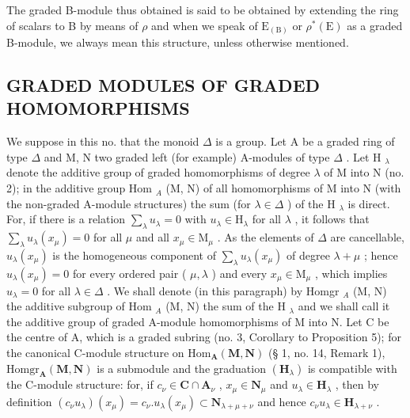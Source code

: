 The graded B-module thus obtained is said to be obtained by extending the ring of scalars to B by means of \(\rho\) and when we speak of \(\mathrm{E}_{(\mathrm{B})}\) or \(\rho^{*}(\mathrm{E})\) as a graded B-module, we always mean this structure, unless otherwise mentioned.

\subsection{GRADED MODULES OF GRADED HOMOMORPHISMS}

We suppose in this no. that the monoid \(\Delta\) is a group. Let A be a graded ring of type \(\Delta\) and M, N two graded left (for example) A-modules of type \(\Delta\) . Let H \(_{\lambda}\) denote the additive group of graded homomorphisms of degree \(\lambda\) of M into N (no. 2); in the additive group Hom \(_{A}\) (M, N) of all homomorphisms of M into N (with the non-graded A-module structures) the sum (for \(\lambda \in \Delta\) ) of the H \(_{\lambda}\) is direct. For, if there is a relation \(\sum_{\lambda} u_{\lambda} = 0\) with \(u_{\lambda} \in \mathrm{H}_{\lambda}\) for all \(\lambda\) , it follows that \(\sum_{\lambda} u_{\lambda}(x_{\mu}) = 0\) for all \(\mu\) and all \(x_{\mu} \in \mathrm{M}_{\mu}\) . As the elements of \(\Delta\) are cancellable, \(u_{\lambda}(x_{\mu})\) is the homogeneous component of \(\sum_{\lambda} u_{\lambda}(x_{\mu})\) of degree \(\lambda + \mu\) ; hence \(u_{\lambda}(x_{\mu}) = 0\) for every ordered pair ( \(\mu, \lambda\) ) and every \(x_{\mu} \in \mathrm{M}_{\mu}\) , which implies \(u_{\lambda} = 0\) for all \(\lambda \in \Delta\) . We shall denote (in this paragraph) by Homgr \(_{A}\) (M, N) the additive subgroup of Hom \(_{A}\) (M, N) the sum of the H \(_{\lambda}\) and we shall call it the additive group of graded A-module homomorphisms of M into N. Let C be the centre of A, which is a graded subring (no. 3, Corollary to Proposition 5); for the canonical C-module structure on \(\mathrm{Hom}_{\mathbf{A}}(\mathbf{M},\mathbf{N})\) (§ 1, no. 14, Remark 1), \(\mathrm{Homgr}_{\mathbf{A}}(\mathbf{M},\mathbf{N})\) is a submodule and the graduation \((\mathbf{H}_{\lambda})\) is compatible with the C-module structure: for, if \(c_{\nu}\in \mathbf{C}\cap \mathbf{A}_{\nu}\) , \(x_{\mu}\in \mathbf{N}_{\mu}\) and \(u_{\lambda}\in \mathbf{H}_{\lambda}\) , then by definition \((c_{\nu}u_{\lambda})(x_{\mu}) = c_{\nu}.u_{\lambda}(x_{\mu})\subset \mathbf{N}_{\lambda +\mu +\nu}\) and hence \(c_{\nu}u_{\lambda}\in \mathbf{H}_{\lambda +\nu}\) .

